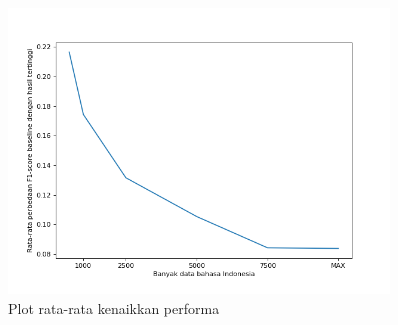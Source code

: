         \begin{figure}[ht]
            \centering
            \includegraphics[width=0.9\textwidth]{resources/plot-gain.png}
            \caption{Plot rata-rata kenaikkan performa}
            \label{fig:plot_gain}
        \end{figure}
        


